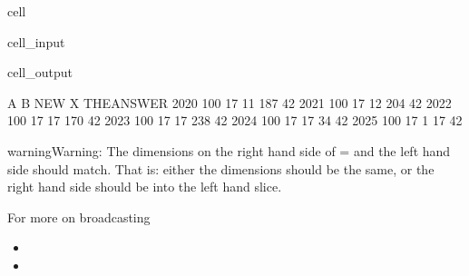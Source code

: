\documentclass[letterpaper,10pt,english]{jupyterBook}
\begin{document}
\begin{sphinxuseclass}{cell}\begin{sphinxVerbatimInput}

\begin{sphinxuseclass}{cell_input}
\begin{sphinxVerbatim}[commandchars=\\\{\}]
\PYG{p}{[}\PYG{p}{]}  
\end{sphinxVerbatim}

\end{sphinxuseclass}\end{sphinxVerbatimInput}
\begin{sphinxVerbatimOutput}

\begin{sphinxuseclass}{cell_output}
\begin{sphinxVerbatim}[commandchars=\\\{\}]
        A   B  NEW    X  THE\PYGZus{}ANSWER
2020  100  17   11  187          42
2021  100  17   12  204          42
2022  100  17   17  170          42
2023  100  17   17  238          42
2024  100  17   17   34          42
2025  100  17    1   17          42
\end{sphinxVerbatim}

\end{sphinxuseclass}\end{sphinxVerbatimOutput}

\end{sphinxuseclass}
\begin{sphinxadmonition}{warning}{Warning:}
\sphinxAtStartPar
The dimensions on the right hand side of = and the left hand side should match. That is: either the dimensions should be the same, or the right hand side should be  into the left hand slice.

\sphinxAtStartPar
For more on broadcasting 
\end{sphinxadmonition}

\sphinxAtStartPar
{}
\begin{itemize}
\item {} 
\sphinxAtStartPar
{}

\item {} 
\sphinxAtStartPar
{}

\end{itemize}
\end{document}
